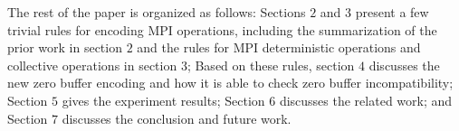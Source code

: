 The rest of the paper is organized as follows: 
Sections $2$ and $3$ present a few trivial rules for encoding MPI operations, including the summarization of the prior work \cite{DBLP:conf/kbse/HuangMM13} in section $2$ and the rules for MPI deterministic operations and collective operations in section $3$; Based on these rules, section $4$ discusses the new zero buffer encoding and how it is able to check zero buffer incompatibility; Section $5$ gives the experiment results; Section $6$ discusses the related work; and Section $7$ discusses the conclusion and future work.



           